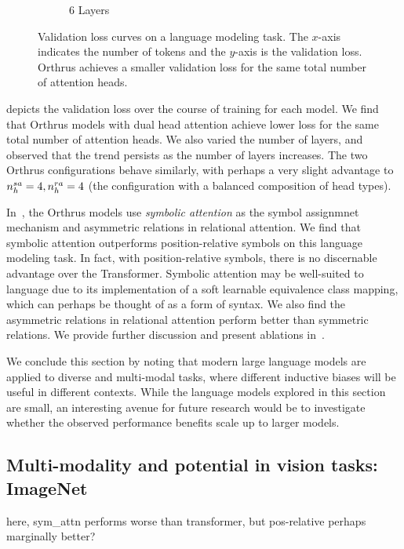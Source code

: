 \begin{figure}[ht]
\begin{subfigure}{0.33\textwidth}
        \caption{6 Layers}
    \end{subfigure}
    \caption{Validation loss curves on a language modeling task. The $x$-axis indicates the number of tokens and the $y$-axis is the validation loss. Orthrus achieves a smaller validation loss for the same total number of attention heads.}\label{fig:tiny_stories_val_loss_curves}
\end{figure}

 depicts the validation loss over the course of training for each model. We find that Orthrus models with dual head attention achieve lower loss for the same total number of attention heads. We also varied the number of layers, and observed that the trend persists as the number of layers increases. The two Orthrus configurations behave similarly, with perhaps a very slight advantage to $n_h^{sa} = 4, n_h^{ra} = 4$ (the configuration with a balanced composition of head types).

In~, the Orthrus models use \textit{symbolic attention} as the symbol assignmnet mechanism and asymmetric relations in relational attention. We find that symbolic attention outperforms position-relative symbols on this language modeling task. In fact, with position-relative symbols, there is no discernable advantage over the Transformer. Symbolic attention may be well-suited to language due to its implementation of a soft learnable equivalence class mapping, which can perhaps be thought of as a form of syntax. We also find the asymmetric relations in relational attention perform better than symmetric relations. We provide further discussion and present ablations in~.

We conclude this section by noting that modern large language models are applied to diverse and multi-modal tasks, where different inductive biases will be useful in different contexts. While the language models explored in this section are small, an interesting avenue for future research would be to investigate whether the observed performance benefits scale up to larger models.

\subsection{Multi-modality and potential in vision tasks: ImageNet}\label{ssec:imagenett}


here, sym\_attn performs worse than transformer, but pos-relative perhaps marginally better?